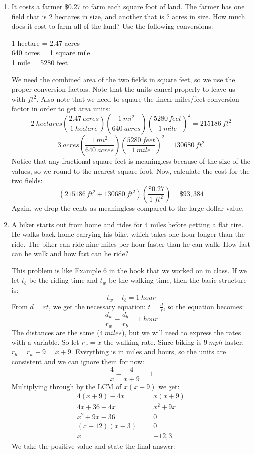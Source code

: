 \documentclass[letterpaper,12pt,fleqn]{article}
\begin{document}
\begin{enumerate}
\item It costs a farmer \$0.27 to farm each square foot of land. The farmer has
  one field that is 2 hectares in size, and another that is 3 acres in size.
  How much does it cost to farm all of the land? Use the following conversions:

  1 hectare = 2.47 acres \\
  640 acres = 1 square mile \\
  1 mile = 5280 feet

  We need the combined area of the two fields in square feet, so we use the
  proper conversion factors. Note that the units cancel properly to leave us
  with $ft^2$. Also note that we need to square the linear miles/feet conversion
  factor in order to get area units:
  \[\SI{2}{hectares}\left(\frac{\SI{2.47}{acres}}{\SI{1}{hectare}}\right)
  \left(\frac{\SI{1}{mi^2}}{\SI{640}{acres}}\right)
  \left(\frac{\SI{5280}{feet}}{\SI{1}{mile}}\right)^2=\SI{215186}{ft^2}\]
  \[\SI{3}{acres}\left(\frac{\SI{1}{mi^2}}{\SI{640}{acres}}\right)
  \left(\frac{\SI{5280}{feet}}{\SI{1}{mile}}\right)^2=\SI{130680}{ft^2}\]
  Notice that any fractional square feet is meaningless because of the size of
  the values, so we round to the nearest square foot. Now, calculate the cost
  for the two fields:
  \[\left(\SI{215186}{ft^2}+\SI{130680}{ft^2}\right)
  \left(\frac{\$0.27}{\SI{1}{ft^2}}\right)=\$93,384\]
  Again, we drop the cents as meaningless compared to the large dollar value.

\item A biker starts out from home and rides for 4 miles before getting a
  flat tire. He walks back home carrying his bike, which takes one hour
  longer than the ride. The biker can ride nine miles per hour faster than he
  can walk. How fast can he walk and how fast can he ride?

  This problem is like Example 6 in the book that we worked on in class. If we
  let $t_b$ be the riding time and $t_w$ be the walking time, then the basic
  structure is:
  \[t_w-t_b=\SI{1}{hour}\]
  From $d=rt$, we get the necessary equation: $t=\frac{d}{r}$, so the equation
  becomes:
  \[\frac{d_w}{r_w}-\frac{d_b}{r_b}=\SI{1}{hour}\]
  The distances are the same ($\SI{4}{miles}$), but we will need to express the
  rates with a variable.  So let $r_w=x$ the walking rate. Since biking is
  $\SI{9}{mph}$ faster, $r_b=r_w+9=x+9$. Everything is in miles and hours, so
  the units are consistent and we can ignore them for now:
  \[\frac{4}{x}-\frac{4}{x+9}=1\]
  Multiplying through by the LCM of $x(x+9)$ we get:
  \begin{eqnarray*}
    4(x+9)-4x &=& x(x+9) \\
    4x+36-4x &=& x^2+9x \\
    x^2+9x-36 &=& 0 \\
    (x+12)(x-3) &=& 0 \\
    x &=& -12,3
  \end{eqnarray*}
  We take the positive value and state the final answer:


\end{enumerate}
\end{document}
